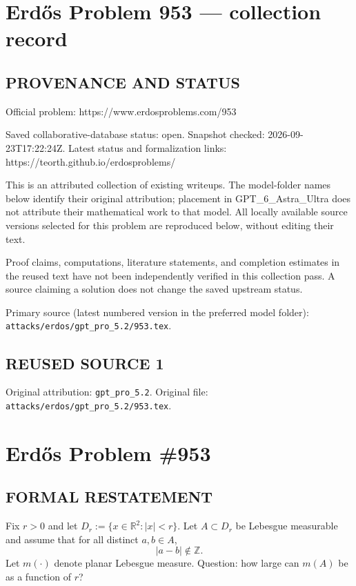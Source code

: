 \section*{Erd\H{o}s Problem 953 --- collection record}

\subsection*{PROVENANCE AND STATUS}
Official problem: https://www.erdosproblems.com/953

Saved collaborative-database status: open.
Snapshot checked: 2026-09-23T17:22:24Z.
Latest status and formalization links: https://teorth.github.io/erdosproblems/

This is an attributed collection of existing writeups. The model-folder names below identify their original attribution; placement in GPT\_6\_Astra\_Ultra does not attribute their mathematical work to that model. All locally available source versions selected for this problem are reproduced below, without editing their text.

Proof claims, computations, literature statements, and completion estimates in the reused text have not been independently verified in this collection pass. A source claiming a solution does not change the saved upstream status.

Primary source (latest numbered version in the preferred model folder): \texttt{attacks/erdos/gpt\_pro\_5.2/953.tex}.

\subsection*{REUSED SOURCE 1}
Original attribution: \texttt{gpt\_pro\_5.2}.
Original file: \texttt{attacks/erdos/gpt\_pro\_5.2/953.tex}.


\section*{Erd\H{o}s Problem \#953}

\subsection*{FORMAL RESTATEMENT}
Fix $r>0$ and let $D_r:=\{x\in\mathbb R^2:|x|<r\}$.
Let $A\subset D_r$ be Lebesgue measurable and assume that for all distinct $a,b\in A$,
\[
|a-b|\notin \mathbb Z.
\]
Let $m(\cdot)$ denote planar Lebesgue measure.
Question: how large can $m(A)$ be as a function of $r$?

